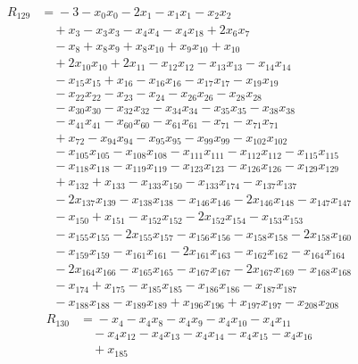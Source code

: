 \begin{align*}
R_{129}&={}-3 -x_{0}x_{0} -2x_{1} -x_{1}x_{1} -x_{2}x_{2}\\
&\quad{}+x_{3} -x_{3}x_{3} -x_{4}x_{4} -x_{4}x_{18} +2x_{6}x_{7}\\
&\quad{}-x_{8} +x_{8}x_{9} +x_{8}x_{10} +x_{9}x_{10} +x_{10}\\
&\quad{}+2x_{10}x_{10} +2x_{11} -x_{12}x_{12} -x_{13}x_{13} -x_{14}x_{14}\\
&\quad{}-x_{15}x_{15} +x_{16} -x_{16}x_{16} -x_{17}x_{17} -x_{19}x_{19}\\
&\quad{}-x_{22}x_{22} -x_{23} -x_{24} -x_{26}x_{26} -x_{28}x_{28}\\
&\quad{}-x_{30}x_{30} -x_{32}x_{32} -x_{34}x_{34} -x_{35}x_{35} -x_{38}x_{38}\\
&\quad{}-x_{41}x_{41} -x_{60}x_{60} -x_{61}x_{61} -x_{71} -x_{71}x_{71}\\
&\quad{}+x_{72} -x_{94}x_{94} -x_{95}x_{95} -x_{99}x_{99} -x_{102}x_{102}\\
&\quad{}-x_{105}x_{105} -x_{108}x_{108} -x_{111}x_{111} -x_{112}x_{112} -x_{115}x_{115}\\
&\quad{}-x_{118}x_{118} -x_{119}x_{119} -x_{123}x_{123} -x_{126}x_{126} -x_{129}x_{129}\\
&\quad{}+x_{132} +x_{133} -x_{133}x_{150} -x_{133}x_{174} -x_{137}x_{137}\\
&\quad{}-2x_{137}x_{139} -x_{138}x_{138} -x_{146}x_{146} -2x_{146}x_{148} -x_{147}x_{147}\\
&\quad{}-x_{150} +x_{151} -x_{152}x_{152} -2x_{152}x_{154} -x_{153}x_{153}\\
&\quad{}-x_{155}x_{155} -2x_{155}x_{157} -x_{156}x_{156} -x_{158}x_{158} -2x_{158}x_{160}\\
&\quad{}-x_{159}x_{159} -x_{161}x_{161} -2x_{161}x_{163} -x_{162}x_{162} -x_{164}x_{164}\\
&\quad{}-2x_{164}x_{166} -x_{165}x_{165} -x_{167}x_{167} -2x_{167}x_{169} -x_{168}x_{168}\\
&\quad{}-x_{174} +x_{175} -x_{185}x_{185} -x_{186}x_{186} -x_{187}x_{187}\\
&\quad{}-x_{188}x_{188} -x_{189}x_{189} +x_{196}x_{196} +x_{197}x_{197} -x_{208}x_{208}
\end{align*}
\begin{align*}
R_{130}&={}-x_{4} -x_{4}x_{8} -x_{4}x_{9} -x_{4}x_{10} -x_{4}x_{11}\\
&\quad{}-x_{4}x_{12} -x_{4}x_{13} -x_{4}x_{14} -x_{4}x_{15} -x_{4}x_{16}\\
&\quad{}+x_{185}
\end{align*}
